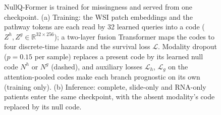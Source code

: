 \documentclass[journal]{IEEEtran}
\newcommand{\pq}{NullQ-Former}
\begin{document}
\begin{figure}[!t]
\centering
\scalebox{0.9}{}
\caption{\pq{} is trained for missingness and served from one checkpoint. (a) Training: the WSI patch embeddings and the pathway tokens are each read by 32 learned queries into a code ($Z^h, Z^g \in \mathbb{R}^{32 \times 256}$); a two-layer fusion Transformer maps the codes to four discrete-time hazards and the survival loss $\mathcal{L}$. Modality dropout ($p = 0.15$ per sample) replaces a present code by its learned null code $N^h$ or $N^g$ (dashed), and auxiliary losses $\mathcal{L}_h$, $\mathcal{L}_g$ on the attention-pooled codes make each branch prognostic on its own (training only). (b) Inference: complete, slide-only and RNA-only patients enter the same checkpoint, with the absent modality's code replaced by its null code.}
\label{fig:arch}
\end{figure}
\end{document}
